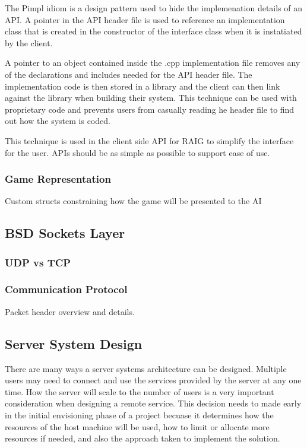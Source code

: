 \documentclass[12pt,a4paper,titlepage]{article}
\begin{document}
The Pimpl idiom is a design pattern used to hide the implemenation details of an API. A pointer in the API header file is used to reference an implementation class that is created in the constructor of the interface class when it is instatiated by the client.

A pointer to an object contained inside the .cpp implementation file removes any of the declarations and includes needed for the API header file. The implementation code is then stored in a library and the client can then link against the library when building their system. This technique can be used with proprietary code and prevents users from casually reading he header file to find out how the system is coded. 

This technique is used in the client side API for RAIG to simplify the interface for the user. APIs should be as simple as possible to support ease of use. 

\subsubsection{Game Representation}

Custom structs constraining how the game will be presented to the AI


\subsection{BSD Sockets Layer}
\label{section:networklayer}

\subsubsection{UDP vs TCP}

\subsubsection{Communication Protocol}

Packet header overview and details.\\

\subsection{Server System Design}
\label{section:serverdesign}

There are many ways a server systems architecture can be designed. Multiple users may need to connect and use the services provided by the server at any one time. How the server will scale to the number of users is a very important consideration when designing a remote service. This decision needs to made early in the initial envisioning phase of a project becuase it determines how the resources of the host machine will be used, how to limit or allocate more resources if needed, and also the approach taken to implement the solution.\\
\end{document}
